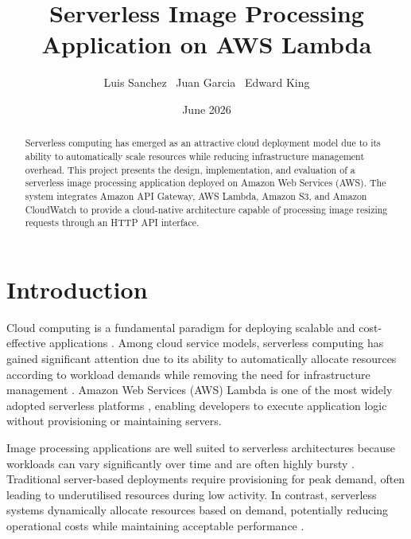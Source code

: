 \documentclass[11pt,a4paper,twocolumn]{article}
\title{
Serverless Image Processing Application on AWS Lambda
}
\author{
Luis Sanchez \
Juan Garcia \
Edward King
}
\date{June 2026}
\begin{document}

\twocolumn
\maketitle


\vspace{0.5cm}

\begin{abstract}

Serverless computing has emerged as an attractive cloud deployment model due to its ability to automatically scale resources while reducing infrastructure management overhead. This project presents the design, implementation, and evaluation of a serverless image processing application deployed on Amazon Web Services (AWS). The system integrates Amazon API Gateway, AWS Lambda, Amazon S3, and Amazon CloudWatch to provide a cloud-native architecture capable of processing image resizing requests through an HTTP API interface.

\end{abstract}

\section{Introduction}
Cloud computing is a fundamental paradigm for deploying scalable and cost-effective applications \citep{armbrust2010view}. Among cloud service models, serverless computing has gained significant attention due to its ability to automatically allocate resources according to workload demands while removing the need for infrastructure management \citep{jonas2019cloud}. Amazon Web Services (AWS) Lambda is one of the most widely adopted serverless platforms \citep{aws_lambda_docs}, enabling developers to execute application logic without provisioning or maintaining servers.

Image processing applications are well suited to serverless architectures because workloads can vary significantly over time and are often highly bursty \citep{spillner2017serverless}. Traditional server-based deployments require provisioning for peak demand, often leading to underutilised resources during low activity. In contrast, serverless systems dynamically allocate resources based on demand, potentially reducing operational costs while maintaining acceptable performance \citep{mackenzie2020serverless_costs}.
\end{document}
